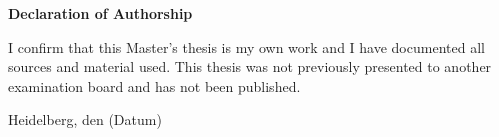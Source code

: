 \setlength{\parindent}{0em}

\thispagestyle{empty}
\begin{center}
	\begin{minipage}[c][0.48\textheight][b]{0.9\textwidth}
		\small
			\textbf{Declaration of Authorship}\par
		\vspace{\baselineskip}
			I confirm that this	Master's thesis is my own work and I have documented all sources and material used. This thesis was not previously presented to another examination board and has not been published.\par			 
   		    \vspace{5\baselineskip}
			Heidelberg, den (Datum)\hspace{3cm}\dotfill		
	\end{minipage} \par \par
\end{center}
